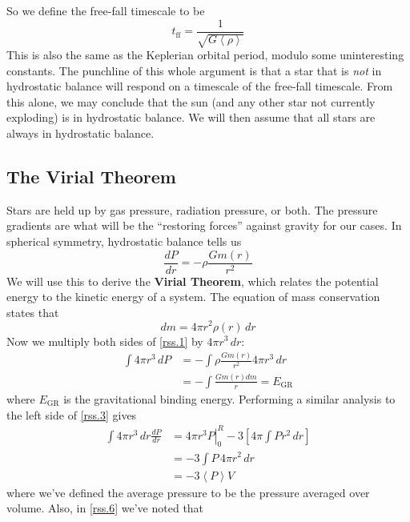 \documentclass[10pt]{article}
\numberwithin{equation}{section}
\newcommand{\avg}[1]{\left\langle#1\right\rangle}
\begin{document}
	So we define the free-fall timescale to be
	\begin{equation}
		\label{mc.7} t_{\mathrm{ff}}=\frac{1}{\sqrt{G\avg{\rho}}}
	\end{equation}
	This is also the same as the Keplerian orbital period, modulo some 
uninteresting constants. The punchline of this whole argument is that a 
star that is \emph{not} in hydrostatic balance will respond on a timescale 
of the free-fall timescale. From this alone, we may conclude that the sun 
(and any other star not currently exploding) is in hydrostatic balance. We 
will then assume that all stars are always in hydrostatic balance.\\
	
	\subsection{The Virial Theorem}
	Stars are held up by gas pressure, radiation pressure, or both. The 
pressure gradients are what will be the ``restoring forces'' against 
gravity for our cases. In spherical symmetry, hydrostatic balance tells us
	\begin{equation}
		\label{rss.1} \frac{dP}{dr}=-\rho\frac{Gm(r)}{r^2}
	\end{equation}
	We will use this to derive the \textbf{Virial Theorem}, which relates 
the potential energy to the kinetic energy of a system. The equation of 
mass conservation states that
	\begin{equation}
		\label{rss.2} dm=4\pi r^2\rho(r)\,dr
	\end{equation}
	Now we multiply both sides of \eqref{rss.1} by $4\pi r^3\,dr$:
	\begin{align}
		\label{rss.3} \int 4\pi r^3\,dP&=-\int \rho\frac{Gm(r)}{r^2}4\pi 
r^3\,dr\\
		\label{rss.4} &= -\int\frac{Gm(r)dm}{r} = E_{\mathrm{GR}}
	\end{align}
	where $E_{\mathrm{GR}}$ is the gravitational binding energy. Performing 
a similar analysis to the left side of \eqref{rss.3} gives
	\begin{align}
		\label{rss.5} \int 4\pi r^3\,dr\frac{dP}{dr} &= \left.4\pi r^3P
\right|_{0}^R-3\left[4\pi\int Pr^2\,dr\right]\\
		\label{rss.6} &= -3\int P\,4\pi  r^2\,dr\\
		\label{rss.7}&=-3\avg{P}V
	\end{align}
	where we've defined the average pressure to be the pressure
        averaged over volume. Also, in \eqref{rss.6} we've noted that
\end{document}

